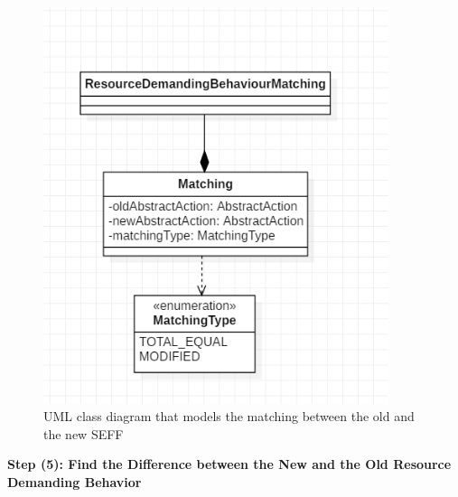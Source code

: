 \begin{figure}[h]
\centering
\includegraphics[width=0.9\textwidth]{figures/seffmachting}
\caption{UML class diagram that models the matching between the old and the new SEFF}
\label{fig:seffmachting}
\end{figure}


\textbf{Step (5): Find the Difference between the New and the Old Resource Demanding Behavior}

